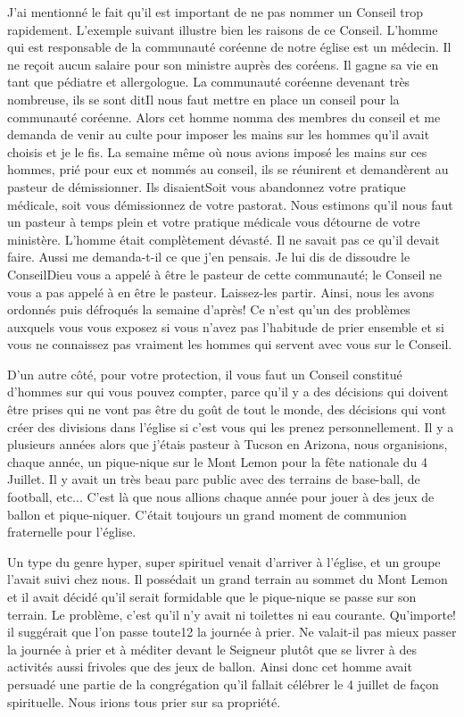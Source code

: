 J’ai mentionné le fait qu’il est important de ne pas nommer un Conseil trop rapidement. L’exemple suivant illustre bien
les raisons de ce Conseil. L’homme qui est responsable de la communauté coréenne de notre église est un médecin. Il
ne reçoit aucun salaire pour son ministre auprès des coréens. Il gagne sa vie en tant que pédiatre et allergologue. La
communauté coréenne devenant très nombreuse, ils se sont dit\frcolon\og Il nous faut mettre en place un conseil pour la
communauté coréenne. \fg{} Alors cet homme nomma des membres du conseil et me demanda de venir au culte pour
imposer les mains sur les hommes qu’il avait choisis et je le fis. La semaine même où nous avions imposé les mains
sur ces hommes, prié pour eux et nommés au conseil, ils se réunirent et demandèrent au pasteur de démissionner. Ils
disaient\frcolon\og Soit vous abandonnez votre pratique médicale, soit vous démissionnez de votre pastorat. Nous estimons
qu’il nous faut un pasteur à temps plein et votre pratique médicale vous détourne de votre ministère.\fg{} L’homme était
complètement dévasté. Il ne savait pas ce qu’il devait faire. Aussi me demanda-t-il ce que j’en pensais. Je lui dis de
dissoudre le Conseil\frcolon\og Dieu vous a appelé à être le pasteur de cette communauté; le Conseil ne vous a pas appelé à
en être le pasteur. Laissez-les partir.\fg{} Ainsi, nous les avons ordonnés puis défroqués la semaine d'après! Ce n’est
qu’un des problèmes auxquels vous vous exposez si vous n’avez pas l’habitude de prier ensemble et si vous ne
connaissez pas vraiment les hommes qui servent avec vous sur le Conseil.

D’un autre côté, pour votre protection, il vous faut un Conseil constitué d’hommes sur qui vous pouvez compter, parce
qu’il y a des décisions qui doivent être prises qui ne vont pas être du goût de tout le monde, des décisions qui vont
créer des divisions dans l’église si c'est vous qui les prenez personnellement. Il y a plusieurs années alors que j’étais
pasteur à Tucson en Arizona, nous organisions, chaque année, un pique-nique sur le Mont Lemon pour la fête
nationale du 4 Juillet. Il y avait un très beau parc public avec des terrains de base-ball, de football, etc... C’est là que
nous allions chaque année pour jouer à des jeux de ballon et pique-niquer. C'était toujours un grand moment de
communion fraternelle pour l'église.

Un type du genre \og hyper, super spirituel\fg{} venait d'arriver à l'église, et un groupe l’avait suivi chez nous. Il possédait
un grand terrain au sommet du Mont Lemon et il avait décidé qu'il serait formidable que le pique-nique se passe sur
son terrain. Le problème, c'est qu'il n’y avait ni toilettes ni eau courante. Qu'importe! il suggérait que l’on passe toute12
la journée à prier. Ne valait-il pas mieux passer la journée à prier et à méditer devant le Seigneur plutôt
que se livrer à des activités aussi frivoles que des jeux de ballon. Ainsi donc cet homme avait persuadé une partie de
la congrégation qu'il fallait célébrer le 4 juillet de façon spirituelle. Nous irions tous prier sur sa propriété.

